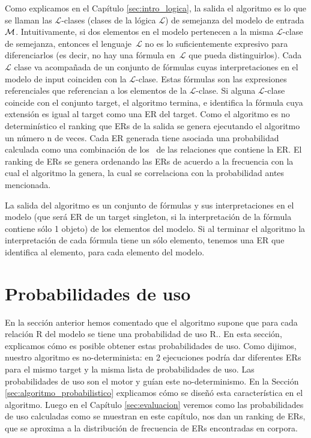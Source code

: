 Como explicamos en el Cap\'itulo \ref{sec:intro_logica}, la salida el algoritmo es lo que se llaman las $\mathcal {L}$-clases (clases de la l\'ogica $\mathcal {L}$) de semejanza del modelo de entrada $\mathcal{M} $. Intuitivamente, si dos elementos en el modelo pertenecen a la misma $\mathcal {L}$-clase de semejanza, entonces el lenguaje~$\mathcal {L}$ no es lo suficientemente expresivo para diferenciarlos (es decir, no hay una f\'ormula en~$\mathcal {L }$ que pueda distinguirlos). Cada  $\mathcal {L}$ clase va acompa\~nada de un conjunto de f\'ormulas cuyas interpretaciones en el modelo de input coinciden con la $\mathcal {L}$-clase. Estas f\'ormulas son las expresiones referenciales que referencian a los elementos de la $\mathcal {L}$-clase. Si alguna $\mathcal {L}$-clase coincide con el conjunto target, el algoritmo termina, e identifica la f\'ormula cuya extensi\'on es igual al target como una ER del target. Como el algoritmo es no determin\'istico el ranking que ERs de la salida se genera ejecutando el algoritmo un n\'umero n de veces. Cada ER generada tiene asociada una probabilidad calculada como una combinaci\'on de los \puse\ de las relaciones que contiene la ER. El ranking de ERs se genera ordenando las ERs de acuerdo a la frecuencia con la cual el algoritmo la genera, la cual se correlaciona con la probabilidad antes mencionada.

La salida del algoritmo es un conjunto de f\'ormulas y sus interpretaciones en el modelo (que ser\'a ER de un target singleton, si la interpretaci\'on de la f\'ormula contiene s\'olo 1 objeto) de los elementos del modelo. Si al terminar el algoritmo la interpretaci\'on de cada f\'ormula tiene un s\'olo elemento, tenemos una ER que identifica al elemento, para cada elemento del modelo. 

\section{Probabilidades de uso}
\label{sec:learning}

En la secci\'on anterior hemos comentado que el algoritmo supone que para cada relaci\'on R del modelo se tiene una probabilidad de uso R.\puse. En esta secci\'on, explicamos c\'omo es posible obtener estas probabilidades de uso. Como dijimos, nuestro algoritmo es no-determinista: en 2 ejecuciones podr\'ia dar diferentes ERs para el mismo target y la misma lista de probabilidades de uso. Las probabilidades de uso son el motor y gu\'ian este no-determinismo. En la Secci\'on \ref{sec:algoritmo_probabilistico} explicamos c\'omo se dise\~n\'o esta caracter\'istica en el algoritmo. Luego en el Cap\'itulo \ref{sec:evaluacion} veremos como las probabilidades de uso calculadas como se muestran en este cap\'itulo, nos dan un ranking de ERs, que se aproxima a la distribuci\'on de frecuencia de ERs encontradas en corpora.

